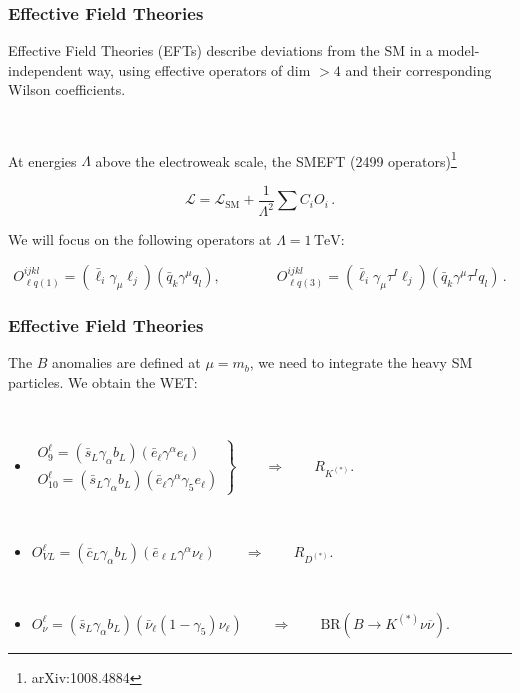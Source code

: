 \documentclass[mathserif, 10pt]{beamer}
\begin{document}
\begin{frame}
    \frametitle{Effective Field Theories}

    Effective Field Theories (EFTs) describe deviations from the SM in a model-independent way, using effective operators of dim $>4$ and their corresponding Wilson coefficients.

    ~

    At energies $\Lambda$ above the electroweak scale, the SMEFT (2499 operators)\footnote[1]{arXiv:1008.4884}

    $$\mathcal{L} = \mathcal{L}_\mathrm{SM} + \frac{1}{\Lambda^2}\sum C_i O_i\,.$$

    We will focus on the following operators at $\Lambda = 1\,\mathrm{TeV}$:

    $$O_{\ell q(1)}^{ijkl} = (\bar{\ell}_i \gamma_\mu \ell_j)(\bar{q}_k \gamma^\mu  q_l),\qquad\qquad O_{\ell q(3)}^{ijkl}= (\bar{\ell}_i \gamma_\mu \tau^I \ell_j)(\bar{q}_k \gamma^\mu \tau^I q_l)\,.$$

\end{frame}

\begin{frame}

    \frametitle{Effective Field Theories}
    The $B$ anomalies are defined at $\mu=m_b$, we need to integrate the heavy SM particles. We obtain the WET\@:

    ~

    \begin{itemize}
        \item $\left.\begin{matrix}
                      O_9^\ell = (\bar{s}_L \gamma_\alpha b_L)(\bar{e}_\ell \gamma^\alpha e_\ell) \\
                      O_{10}^\ell = (\bar{s}_L \gamma_\alpha b_L)(\bar{e}_\ell \gamma^\alpha \gamma_5 e_\ell)
                  \end{matrix}\right\} \qquad \Longrightarrow \qquad R_{K^{(*)}}$. %

              ~

        \item $O_{VL}^\ell = (\bar{c}_L \gamma_\alpha b_L)(\bar{e}_{\ell\,L} \gamma^\alpha \nu_\ell) \qquad\Longrightarrow\qquad R_{D^{(*)}}$.

              ~

        \item $O_\nu^\ell = (\bar{s}_L \gamma_\alpha b_L)(\bar{\nu}_\ell (1-\gamma_5) \nu_\ell) \qquad\Longrightarrow \qquad \mathrm{BR}(B\to K^{(*)}\nu\overline{\nu})$.
    \end{itemize}



\end{frame}
\end{document}
